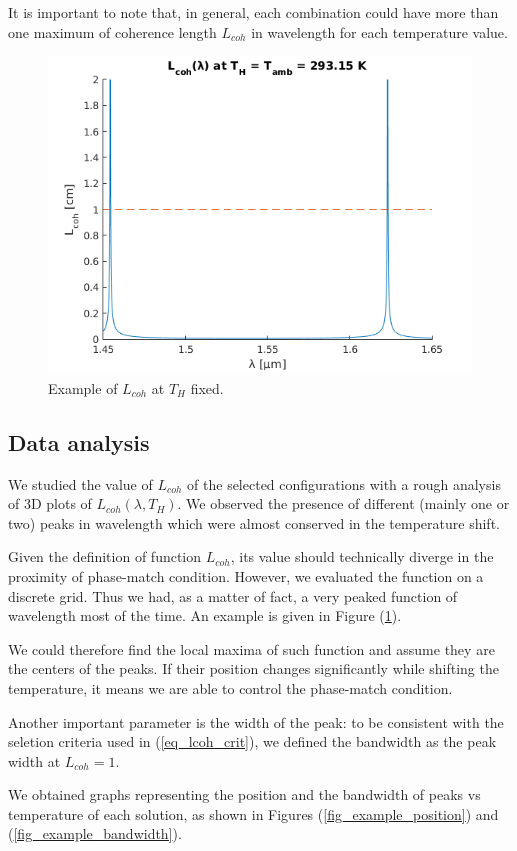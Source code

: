 \documentclass[12pt,a4paper,twoside]{article}
\begin{document}
It is important to note that, in general, each combination could have more than one maximum of coherence length $L_{coh}$ in wavelength for each temperature value.

\begin{figure}[!h]
	\centering
	\includegraphics[width=.75\textwidth]{delta_example.png}
	\caption{Example of $L_{coh}$ at $T_H$ fixed.}
	\label{fig_peaks}
\end{figure}

\subsection{Data analysis}
We studied the value of $L_{coh}$ of the selected configurations with a rough analysis of 3D plots of $L_{coh}(\lambda,T_{H})$.
We observed the presence of different (mainly one or two) peaks in wavelength which were almost conserved in the temperature shift.

Given the definition of function $L_{coh}$, its value should technically diverge in the proximity of phase-match condition.
However, we evaluated the function on a discrete grid.
Thus we had, as a matter of fact, a very peaked function of wavelength most of the time.
An example is given in Figure (\ref{fig_peaks}).

We could therefore find the local maxima of such function and assume they are the centers of the peaks.
If their position changes significantly while shifting the temperature, it means we are able to control the phase-match condition.

Another important parameter is the width of the peak: to be consistent with the seletion criteria used in (\ref{eq_lcoh_crit}), we defined the bandwidth as the peak width at $L_{coh} = 1$.

We obtained graphs representing the position and the bandwidth of peaks vs temperature of each solution, as shown in Figures (\ref{fig_example_position}) and (\ref{fig_example_bandwidth}).
\end{document}
